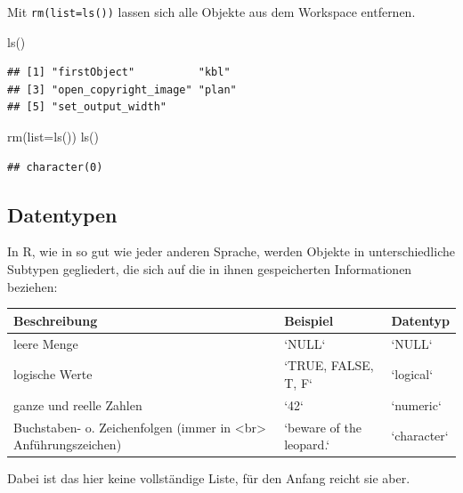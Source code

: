 \documentclass[
]{book}
\newenvironment{Shaded}{\begin{snugshade}}{\end{snugshade}}
\newcommand{\AttributeTok}[1]{\textcolor[rgb]{0.77,0.63,0.00}{#1}}
\newcommand{\FunctionTok}[1]{\textcolor[rgb]{0.00,0.00,0.00}{#1}}
\newcommand{\NormalTok}[1]{#1}
\begin{document}
Mit \texttt{rm(list=ls())} lassen sich alle Objekte aus dem Workspace entfernen.

\begin{Shaded}
\begin{Highlighting}[]
\FunctionTok{ls}\NormalTok{()}
\end{Highlighting}
\end{Shaded}

\begin{verbatim}
## [1] "firstObject"          "kbl"                 
## [3] "open_copyright_image" "plan"                
## [5] "set_output_width"
\end{verbatim}

\begin{Shaded}
\begin{Highlighting}[]
\FunctionTok{rm}\NormalTok{(}\AttributeTok{list=}\FunctionTok{ls}\NormalTok{())}
\FunctionTok{ls}\NormalTok{()}
\end{Highlighting}
\end{Shaded}

\begin{verbatim}
## character(0)
\end{verbatim}

\hypertarget{datentypen}{%
\subsection*{Datentypen}\label{datentypen}}

\small

In R, wie in so gut wie jeder anderen Sprache, werden Objekte in unterschiedliche Subtypen gegliedert, die sich auf die in ihnen gespeicherten Informationen beziehen:

\begin{tabular}[t]{l|l|l}
\hline
Beschreibung & Beispiel & Datentyp\\
\hline
leere Menge & `NULL` & `NULL`\\
\hline
logische Werte & `TRUE, FALSE, T,  F` & `logical`\\
\hline
ganze und reelle Zahlen & `42` & `numeric`\\
\hline
Buchstaben- o. Zeichenfolgen (immer in <br> Anführungszeichen) & `beware of the leopard.` & `character`\\
\hline
\end{tabular}

Dabei ist das hier keine vollständige Liste, für den Anfang reicht sie aber.
\end{document}
